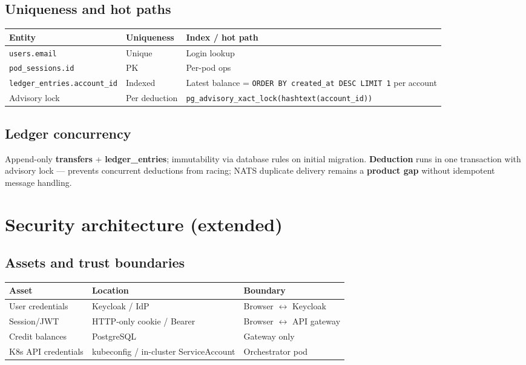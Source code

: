 \documentclass[12pt,a4paper]{article}
\begin{document}
\subsection{Uniqueness and hot paths}
\begin{tabularx}{\textwidth}{@{}L{3.2cm} L{3.5cm} X@{}}
  \toprule
  \textbf{Entity} & \textbf{Uniqueness} & \textbf{Index / hot path} \\
  \midrule
  \texttt{users.email} & Unique & Login lookup \\
  \texttt{pod\_sessions.id} & PK & Per-pod ops \\
  \texttt{ledger\_entries.account\_id} & Indexed & Latest balance = \texttt{ORDER BY created\_at DESC LIMIT 1} per account \\
  Advisory lock & Per deduction & \texttt{pg\_advisory\_xact\_lock(hashtext(account\_id))} \\
  \bottomrule
\end{tabularx}

\subsection{Ledger concurrency}
Append-only \textbf{transfers} + \textbf{ledger\_entries}; immutability via database rules on initial migration. \textbf{Deduction} runs in one transaction with advisory lock --- prevents concurrent deductions from racing; NATS duplicate delivery remains a \textbf{product gap} without idempotent message handling.

\section{Security architecture (extended)}
\label{app:security-extended}

\subsection{Assets and trust boundaries}
\begin{tabularx}{\textwidth}{@{}L{3.2cm} L{3.2cm} X@{}}
  \toprule
  \textbf{Asset} & \textbf{Location} & \textbf{Boundary} \\
  \midrule
  User credentials & Keycloak / IdP & Browser $\leftrightarrow$ Keycloak \\
  Session/JWT & HTTP-only cookie / Bearer & Browser $\leftrightarrow$ API gateway \\
  Credit balances & PostgreSQL & Gateway only \\
  K8s API credentials & kubeconfig / in-cluster ServiceAccount & Orchestrator pod \\
  \bottomrule
\end{tabularx}
\end{document}
